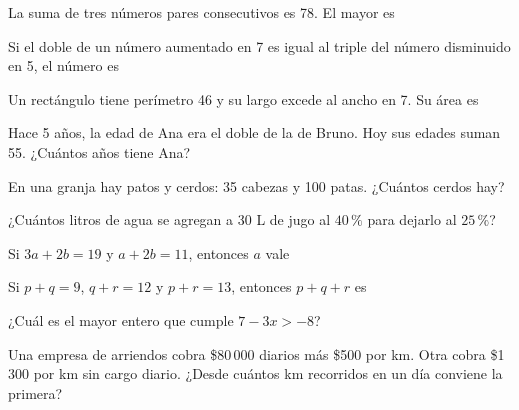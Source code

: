 \evaluacion
\begin{ejercicios}
\item La suma de tres números pares consecutivos es 78. El mayor es
\item Si el doble de un número aumentado en 7 es igual al triple del número disminuido en 5, el número es
\item Un rectángulo tiene perímetro 46 y su largo excede al ancho en 7. Su área es
\item Hace 5 años, la edad de Ana era el doble de la de Bruno. Hoy sus edades suman 55. ¿Cuántos años tiene Ana?
\item En una granja hay patos y cerdos: 35 cabezas y 100 patas. ¿Cuántos cerdos hay?
\item ¿Cuántos litros de agua se agregan a 30 L de jugo al $40\,\%$ para dejarlo al $25\,\%$?
\item Si $3a + 2b = 19$ y $a + 2b = 11$, entonces $a$ vale
\item Si $p + q = 9$, $q + r = 12$ y $p + r = 13$, entonces $p + q + r$ es
\item ¿Cuál es el mayor entero que cumple $7 - 3x > -8$?
\item Una empresa de arriendos cobra \$80\,000 diarios más \$500 por km. Otra cobra \$1\,300 por km sin cargo diario. ¿Desde cuántos km recorridos en un día conviene la primera?
\end{ejercicios}

